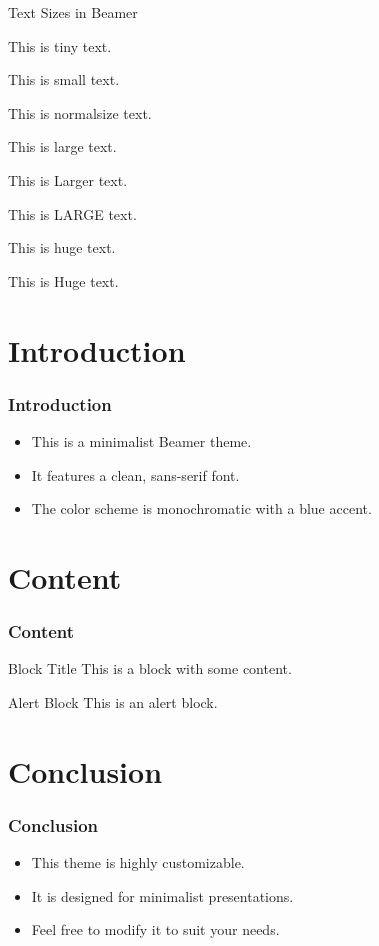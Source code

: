 \documentclass{beamer}
\begin{document}

\begin{frame}{Text Sizes in Beamer}

    {\tiny This is tiny text.}
  
    {\small This is small text.}
  
    {\normalsize This is normalsize text.}
  
    {\large This is large text.}
  
    {\Large This is Larger text.}
  
    {\LARGE This is LARGE text.}
  
    {\huge This is huge text.}
  
    {\Huge This is Huge text.}
\end{frame}

\section{Introduction}
\begin{frame}
  \frametitle{Introduction}
  \begin{itemize}
    \item This is a minimalist Beamer theme.
    \item It features a clean, sans-serif font.
    \item The color scheme is monochromatic with a blue accent.
  \end{itemize}
\end{frame}

\section{Content}
\begin{frame}
  \frametitle{Content}
  \begin{block}{Block Title}
    This is a block with some content.
  \end{block}
  \begin{alertblock}{Alert Block}
    This is an alert block.
  \end{alertblock}
\end{frame}

\section{Conclusion}
\begin{frame}
  \frametitle{Conclusion}
  \begin{itemize}
    \item This theme is highly customizable.
    \item It is designed for minimalist presentations.
    \item Feel free to modify it to suit your needs.
  \end{itemize}
\end{frame}
\end{document}

